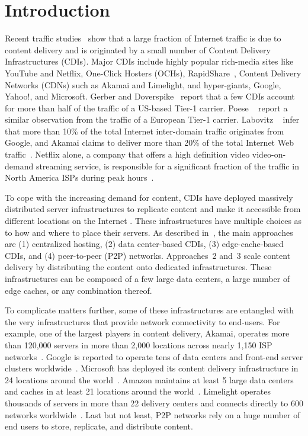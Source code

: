 \section{Introduction}\label{sec:introduction}

Recent traffic studies~\cite{TrafficTypesGrowth:2011,arbor,PADIS2010} show that
a large fraction of Internet traffic is due to content delivery and is
originated by a small number of Content Delivery Infrastructures (CDIs). Major
CDIs include highly popular rich-media sites like YouTube and Netflix,
One-Click Hosters (OCHs), \eg RapidShare~\cite{OCH-performance},
Content Delivery Networks (CDNs) such as Akamai and Limelight, and
hyper-giants, \eg Google, Yahoo!, and Microsoft.  Gerber and Doverspike~\cite
{TrafficTypesGrowth:2011} report that a few CDIs account for more than half of
the traffic of a US-based Tier-1 carrier.  Poese \etal~\cite{PADIS2010} report
a similar observation from the traffic of a European Tier-1 carrier. Labovitz
\etal~\cite{arbor} infer that more than 10\% of the total Internet inter-domain
traffic originates from Google, and Akamai claims to deliver more than 20\% of
the total Internet Web traffic~\cite{Akamai-Network}. Netflix alone, a company
that offers a high definition video video-on-demand streaming service, is
responsible for a significant fraction of the traffic in North America ISPs
during peak hours~\cite{sandvine,Netflix-CDN-presentation}.

To cope with the increasing demand for content, CDIs have deployed massively
distributed server infrastructures to replicate content and make it accessible
from different locations on the Internet \cite{CDNsec2009}. These
infrastructures have multiple choices as to how and where to place their
servers. As described in~\cite {ImprovingPerformanceInternet2009}, the main
approaches are (1) centralized hosting, (2) data center-based CDIs, (3)
edge-cache-based CDIs, and (4) peer-to-peer (P2P) networks. Approaches~2 and~3
scale content delivery by distributing the content onto dedicated
infrastructures.  These infrastructures can be composed of a few large data
centers, a large number of edge caches, or any combination thereof.

To complicate matters further, some of these infrastructures are entangled with
the very infrastructures that provide network connectivity to end-users. For
example, one of the largest players in content delivery, Akamai, operates more
than 120,000 servers in more than 2,000 locations across nearly 1,150 ISP
networks~\cite {Akamai-Network,Akamai-website}. Google is reported to operate
tens of data centers and front-end server clusters
worldwide~\cite{MovingBeyondE2E2009,Tariq:What-if,Google-Datacenters}.
Microsoft has deployed its content delivery infrastructure in 24 locations
around the world~\cite{azure}. Amazon maintains at least 5 large data centers
and caches in at least 21 locations around the world~\cite{amazon}. Limelight
operates thousands of servers in more than 22 delivery centers and connects
directly to 600 networks worldwide~\cite{LLNetworks}. Last but not least, P2P
networks rely on a huge number of end users to store, replicate, and distribute
content.

